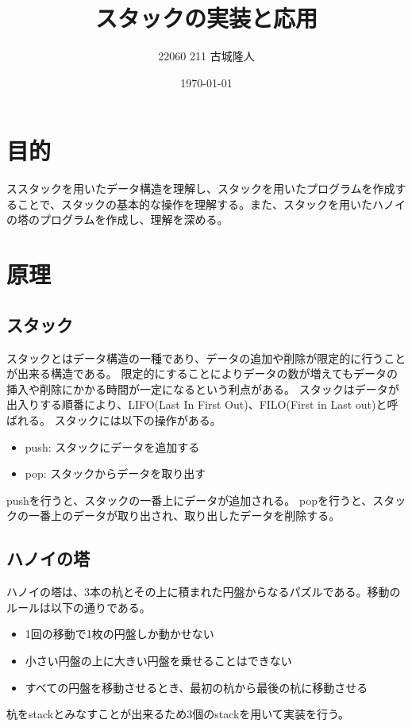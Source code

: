 \documentclass[dvipdfmx]{jsarticle}
\begin{document}
\title{スタックの実装と応用}
\author{22060 211 古城隆人}
\date{\today}
\maketitle


\newpage


\section{目的}
ススタックを用いたデータ構造を理解し、スタックを用いたプログラムを作成することで、スタックの基本的な操作を理解する。また、スタックを用いたハノイの塔のプログラムを作成し、理解を深める。
\section{原理}
\subsection{スタック}
スタックとはデータ構造の一種であり、データの追加や削除が限定的に行うことが出来る構造である。
限定的にすることによりデータの数が増えてもデータの挿入や削除にかかる時間が一定になるという利点がある。
スタックはデータが出入りする順番により、LIFO(Last In First Out)、FILO(First in Last out)と呼ばれる。
スタックには以下の操作がある。
\begin{itemize}
  \item push: スタックにデータを追加する
  \item pop: スタックからデータを取り出す
\end{itemize}
pushを行うと、スタックの一番上にデータが追加される。
popを行うと、スタックの一番上のデータが取り出され、取り出したデータを削除する。
\subsection{ハノイの塔}\label{sec:mysection}
ハノイの塔は、3本の杭とその上に積まれた円盤からなるパズルである。移動のルールは以下の通りである。
\begin{itemize}
  \item 1回の移動で1枚の円盤しか動かせない
  \item 小さい円盤の上に大きい円盤を乗せることはできない
  \item すべての円盤を移動させるとき、最初の杭から最後の杭に移動させる
\end{itemize}
杭をstackとみなすことが出来るため3個のstackを用いて実装を行う。
\end{document}

